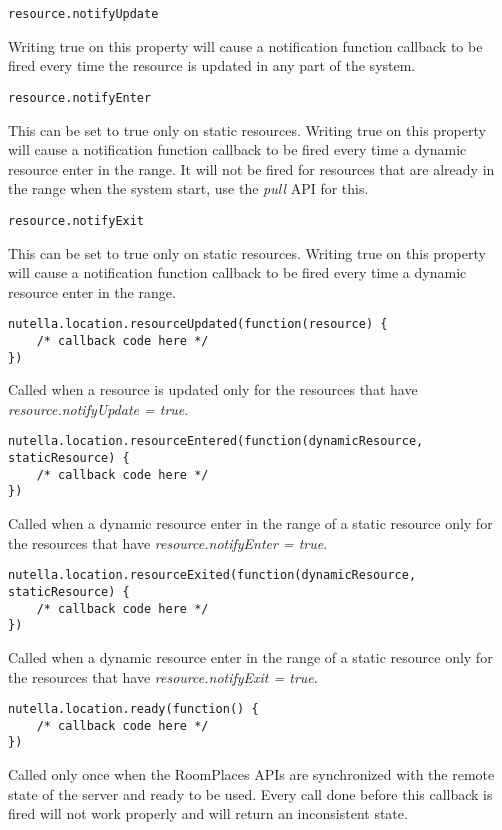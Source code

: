\begin{lstlisting}
resource.notifyUpdate
\end{lstlisting}
Writing true on this property will cause a notification function callback to be fired every time the resource is updated in any part of the system.

\begin{lstlisting}
resource.notifyEnter
\end{lstlisting}
This can be set to true only on static resources. Writing true on this property will cause a notification function callback to be fired every time a dynamic resource enter in the range. It will not be fired for resources that are already in the range when the system start, use the \textit{pull} API for this.

\begin{lstlisting}
resource.notifyExit
\end{lstlisting}
This can be set to true only on static resources. Writing true on this property will cause a notification function callback to be fired every time a dynamic resource enter in the range.

\begin{lstlisting}
nutella.location.resourceUpdated(function(resource) {
    /* callback code here */
})
\end{lstlisting}
Called when a resource is updated only for the resources that have \textit{resource.notifyUpdate = true}. 

\begin{lstlisting}
nutella.location.resourceEntered(function(dynamicResource, staticResource) {
    /* callback code here */
})
\end{lstlisting}
Called when a dynamic resource enter in the range of a static resource only for the resources that have \textit{resource.notifyEnter = true}.

\begin{lstlisting}
nutella.location.resourceExited(function(dynamicResource, staticResource) {
    /* callback code here */
})
\end{lstlisting}
Called when a dynamic resource enter in the range of a static resource only for the resources that have \textit{resource.notifyExit = true}.

\begin{lstlisting}
nutella.location.ready(function() {
    /* callback code here */
})
\end{lstlisting}
Called only once when the RoomPlaces APIs are synchronized with the remote state of the server and ready to be used. Every call done before this callback is fired will not work properly and will return an inconsistent state. 
